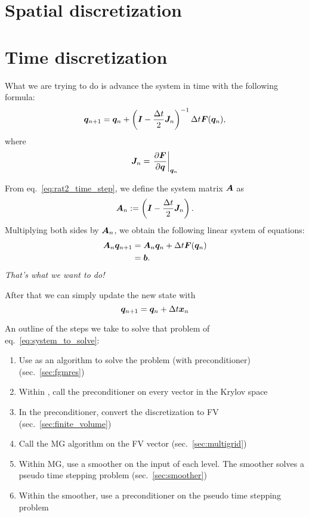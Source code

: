 \documentclass{article}
\begin{document}
\section{Spatial discretization}

\section{Time discretization}

What we are trying to do is advance the system in time with the following formula:
\begin{equation}\label{eq:rat2_time_step}
    \bm{q}_{n+1} = \bm{q}_n + \left( \bm{I} - \dfrac{\Delta t}{2}\bm{J}_{n} \right)^{-1} \Delta t \bm{F}(\bm{q}_{n})
    \text{,}
\end{equation}
where
\begin{equation}
    \bm{J}_n = \left. \dfrac{\partial\bm{F}}{\partial\bm{q}} \right|_{\bm{q}_n}
\end{equation}

From eq.~\ref{eq:rat2_time_step}, we define the system matrix $\bm{A}$ as
\begin{equation}\label{eq:system_mat}
    \bm{A}_n := \left( \bm{I} - \dfrac{\Delta t}{2}\bm{J}_{n} \right)
    \text{.}
\end{equation}
Multiplying both sides by $\bm{A}_n$, we obtain the following linear system of
equations:
\begin{align}\label{eq:system_to_solve}
    \bm{A}_n \bm{q}_{n+1} &= \bm{A}_n\bm{q}_n + \Delta t \bm{F}(\bm{q}_{n}) \\
                             &= \bm{b}
    \text{.}
\end{align}
\emph{That's what we want to do!}

After that we can simply update the new state with
\begin{equation}
    \bm{q}_{n+1} = \bm{q}_n + \Delta t\bm{x}_n
\end{equation}

An outline of the steps we take to solve that problem of eq.~\ref{eq:system_to_solve}:
\begin{enumerate}
    \item Use \fgmres{} as an algorithm to solve the problem (with preconditioner) (sec.~\ref{sec:fgmres})
    \item Within \fgmres, call the preconditioner on every vector in the Krylov space 
    \item In the preconditioner, convert the discretization to FV (sec.~\ref{sec:finite_volume})
    \item Call the MG algorithm on the FV vector (sec.~\ref{sec:multigrid})
    \item Within MG, use a smoother on the input of each level. The smoother solves a pseudo time stepping problem (sec.~\ref{sec:smoother})
    \item Within the smoother, use a preconditioner on the pseudo time stepping problem
\end{enumerate}
\end{document}
